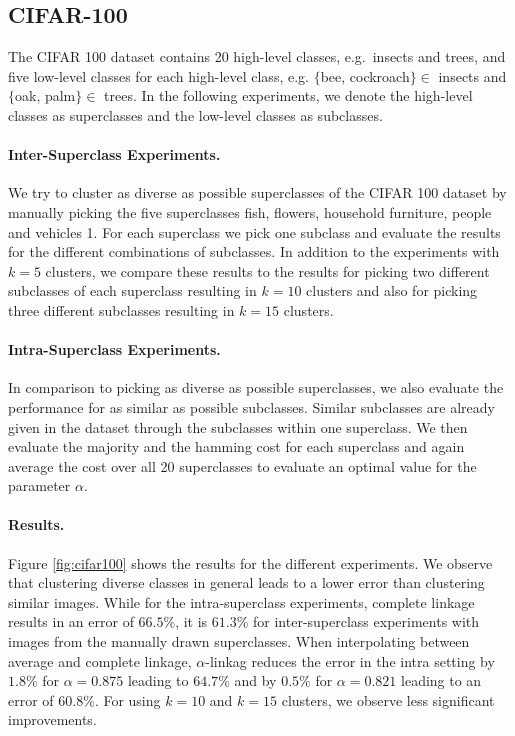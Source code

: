 \subsection{CIFAR-100}

The CIFAR 100 dataset contains 20 high-level classes, e.g.\ insects and trees, and five low-level classes for each high-level class, e.g. $\{$bee, cockroach$\} \in$ insects and $\{$oak, palm$\} \in$ trees. In the following experiments, we denote the high-level classes as superclasses and the low-level classes as subclasses.

\paragraph{Inter-Superclass Experiments.} We try to cluster as diverse as possible superclasses of the CIFAR 100 dataset by manually picking the five superclasses fish, flowers, household furniture, people and vehicles 1. For each superclass we pick one subclass and evaluate the results for the different combinations of subclasses. In addition to the experiments with $k = 5$ clusters, we compare these results to the results for picking two different subclasses of each superclass resulting in $k = 10$ clusters and also for picking three different subclasses resulting in $k = 15$ clusters.

\paragraph{Intra-Superclass Experiments.} In comparison to picking as diverse as possible superclasses, we also evaluate the performance for as similar as possible subclasses. Similar subclasses are already given in the dataset through the subclasses within one superclass. We then evaluate the majority and the hamming cost for each superclass and again average the cost over all 20 superclasses to evaluate an optimal value for the parameter $\alpha$. 

\paragraph{Results.} Figure \ref{fig:cifar100} shows the results for the different experiments. We observe that clustering diverse classes in general leads to a lower error than clustering similar images. While for the intra-superclass experiments, complete linkage results in an error of $66.5\%$, it is $61.3\%$ for inter-superclass experiments with images from the manually drawn superclasses. When interpolating between average and complete linkage, $\alpha$-linkag reduces the error in the intra setting by $1.8\%$ for $\alpha = 0.875$ leading to $64.7\%$ and by $0.5\%$ for $\alpha = 0.821$ leading to an error of $60.8\%$. For using $k = 10$ and $k = 15$ clusters, we observe less significant improvements.

